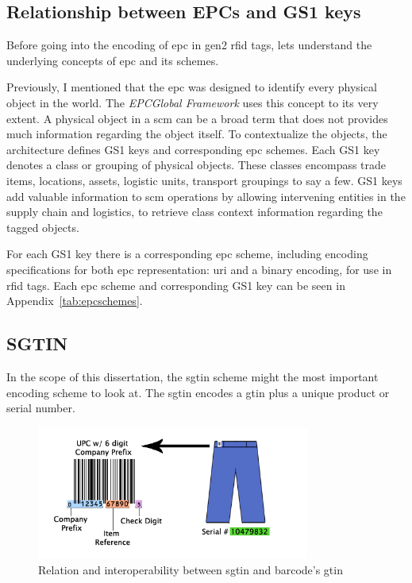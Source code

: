 \subsection{Relationship between EPCs and GS1 keys}

Before going into the encoding of \ac{epc} in \ac{gen2} \ac{rfid} tags, lets understand the underlying concepts of \ac{epc} and its schemes.

Previously, I mentioned that the \ac{epc} was designed to identify every physical object in the world.
The \emph{EPCGlobal Framework} uses this concept to its very extent.
A physical object in a \ac{scm} can be a broad term that does not provides much information regarding the object itself.
To contextualize the objects, the architecture defines GS1 keys and corresponding \ac{epc} schemes.
Each GS1 key denotes a class or grouping of physical objects. These classes encompass trade items, locations, assets, logistic units, transport groupings to say a few.
GS1 keys add valuable information to \ac{scm} operations by allowing intervening entities in the supply chain and logistics, to retrieve class context information regarding the tagged objects.

For each GS1 key there is a corresponding \ac{epc} scheme, including encoding specifications for both \ac{epc} representation: \ac{uri} and a binary encoding, for use in \ac{rfid} tags.
Each \ac{epc} scheme and corresponding GS1 key can be seen in Appendix~\ref{tab:epcschemes}.

\subsection{SGTIN}

In the scope of this dissertation, the \ac{sgtin} scheme might the most important encoding scheme to look at.
The \ac{sgtin} encodes a \ac{gtin} plus a unique product or serial number.

\begin{figure}[!ht]
    \centering
    \includegraphics[width=0.8\textwidth]{./figs/02-state-of-the-art/SGTIN_UPC_Compare.jpg}
    \caption[Relation and interoperability between \ac{sgtin} and barcode's \ac{gtin}]{Relation and interoperability between \ac{sgtin} and barcode's \ac{gtin}~\cite{SGTININFO}} 
    \label{fig:barcodesgtin}
\end{figure}

